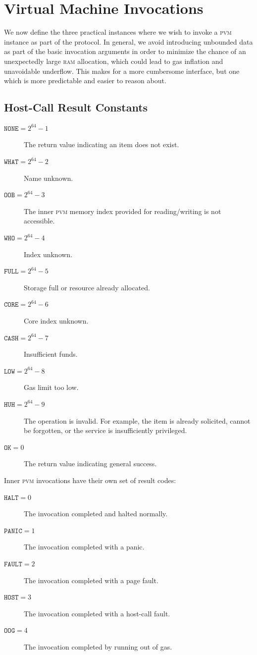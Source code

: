 \section{Virtual Machine Invocations}\label{sec:virtualmachineinvocations}

We now define the three practical instances where we wish to invoke a \textsc{pvm} instance as part of the protocol. In general, we avoid introducing unbounded data as part of the basic invocation arguments in order to minimize the chance of an unexpectedly large \textsc{ram} allocation, which could lead to gas inflation and unavoidable underflow. This makes for a more cumbersome interface, but one which is more predictable and easier to reason about.

\subsection{Host-Call Result Constants}

\begin{description}
  \item[$\mathtt{NONE} = 2^{64} - 1$] The return value indicating an item does not exist.
  \item[$\mathtt{WHAT} = 2^{64} - 2$] Name unknown.
  \item[$\mathtt{OOB} = 2^{64} - 3$] The inner \textsc{pvm} memory index provided for reading/writing is not accessible.
  \item[$\mathtt{WHO} = 2^{64} - 4$] Index unknown.
  \item[$\mathtt{FULL} = 2^{64} - 5$] Storage full or resource already allocated.
  \item[$\mathtt{CORE} = 2^{64} - 6$] Core index unknown.
  \item[$\mathtt{CASH} = 2^{64} - 7$] Insufficient funds.
  \item[$\mathtt{LOW} = 2^{64} - 8$] Gas limit too low.
  \item[$\mathtt{HUH} = 2^{64} - 9$] The operation is invalid. For example, the item is already solicited, cannot be forgotten, or the service is insufficiently privileged.
  \item[$\mathtt{OK} = 0$] The return value indicating general success.
\end{description}

Inner \textsc{pvm} invocations have their own set of result codes:
\begin{description}
  \item[$\mathtt{HALT} = 0$] The invocation completed and halted normally.
  \item[$\mathtt{PANIC} = 1$] The invocation completed with a panic.
  \item[$\mathtt{FAULT} = 2$] The invocation completed with a page fault.
  \item[$\mathtt{HOST} = 3$] The invocation completed with a host-call fault.
  \item[$\mathtt{OOG} = 4$] The invocation completed by running out of gas.
\end{description}

